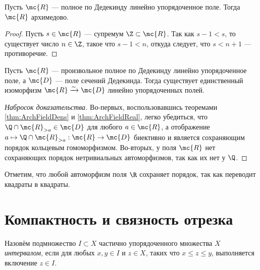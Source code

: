 \documentclass[
	extrafontsizes,
	11pt,
	hyphens,
]{memoir}
\begin{document}
\begin{theorem}
\label{thm:ArchFieldReal}
Пусть \(\mc{R}\) --- полное по Дедекинду линейно упорядоченное поле.
Тогда \(\mc{R}\) архимедово.
\end{theorem}

\begin{proof}
Пусть \(s \in \mc{R}\) --- супремум \(\Z \subset \mc{R}\).
Так как \(s - 1 < s\), то существует число \(n \in \Z\), такое что \(s - 1 < n\), откуда следует, что \(s < n + 1\) --- противоречие.
\end{proof}

\begin{theorem}
Пусть \(\mc{R}\) --- произвольное полное по Дедекинду линейно упорядоченное поле,
а \(\mc{D}\) --- поле сечений Дедекинда.
Тогда существует единственный изоморфизм \(\mc{R} \xrightarrow{\sim} \mc{D}\) линейно упорядоченных полей.
\end{theorem}

\begin{proof}[Набросок доказательства]
Во-первых, воспользовавшись теоремами \ref{thm:ArchFieldDens} и \ref{thm:ArchFieldReal}, легко убедиться, что \(\Q \cap \mc{R}_{> a} \in \mc{D}\) для любого \(a \in \mc{R}\), а отображение \(a \mapsto \Q \cap \mc{R}_{> a} : \mc{R} \to \mc{D}\) биективно и является сохраняющим порядок кольцевым гомоморфизмом.
Во-вторых, у поля \(\mc{R}\) нет сохраняющих порядок нетривиальных автоморфизмов, так как их нет у \(\Q\).
\end{proof}

\begin{remark}
Отметим, что любой автоморфизм поля \(\R\) сохраняет порядок, так как переводит квадраты в квадраты.
\end{remark}


\section{Компактность и связность отрезка}

\begin{definition}
Назовём подмножество \(I \subset X\) частично упорядоченного множества \(X\) \emph{интервалом}, если для любых \(x,y \in I\) и \(z \in X\), таких что \(x \leq z \leq y\), выполняется включение \(z \in I\).
\end{definition}
\end{document}
